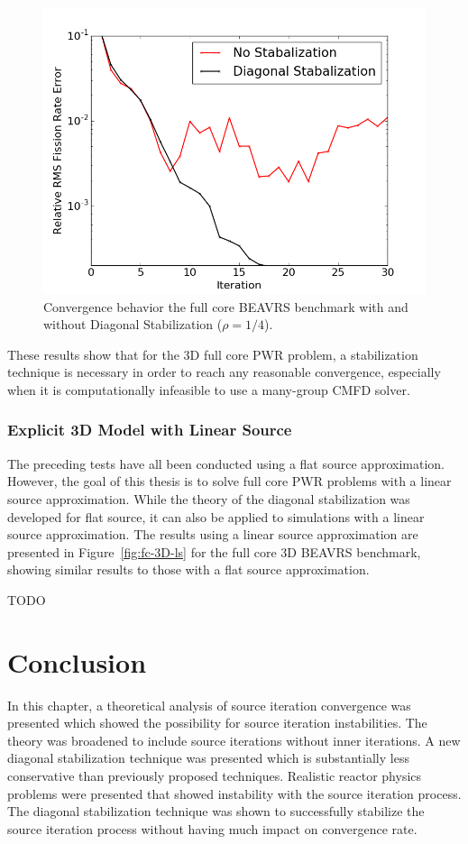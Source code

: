 \begin{figure}[ht!]
	\centering
	\includegraphics[width=0.65\linewidth]{figures/convergence/full-core-3D.png}
	\caption{Convergence behavior the full core \ac{BEAVRS} benchmark with and without Diagonal Stabilization ($\rho = 1/4$).}
	\label{fig:fc-3D}
\end{figure}

These results show that for the 3D full core \ac{PWR} problem, a stabilization technique is necessary in order to reach any reasonable convergence, especially when it is computationally infeasible to use a many-group \ac{CMFD} solver.

\subsubsection{Explicit 3D Model with Linear Source}

The preceding tests have all been conducted using a flat source approximation. However, the goal of this thesis is to solve full core \ac{PWR} problems with a linear source approximation. While the theory of the diagonal stabilization was developed for flat source, it can also be applied to simulations with a linear source approximation. The results using a linear source approximation are presented in Figure~\ref{fig:fc-3D-ls} for the full core 3D BEAVRS benchmark, showing similar results to those with a flat source approximation.

TODO



\section{Conclusion}
\label{sec:convergence-conclusion}

In this chapter, a theoretical analysis of source iteration convergence was presented which showed the possibility for source iteration instabilities. The theory was broadened to include source iterations without inner iterations. A new diagonal stabilization technique was presented which is substantially less conservative than previously proposed techniques. Realistic reactor physics problems were presented that showed instability with the source iteration process. The diagonal stabilization technique was shown to successfully stabilize the source iteration process without having much impact on convergence rate.

